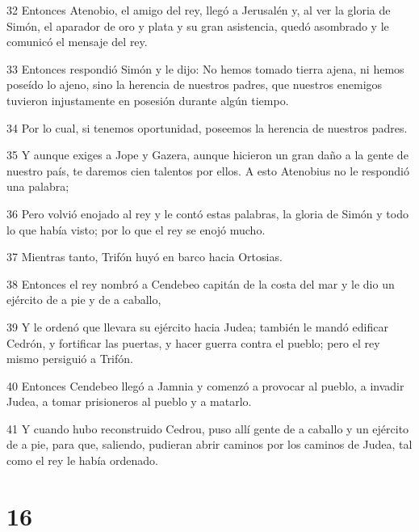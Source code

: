 \par 32 Entonces Atenobio, el amigo del rey, llegó a Jerusalén y, al ver la gloria de Simón, el aparador de oro y plata y su gran asistencia, quedó asombrado y le comunicó el mensaje del rey.
\par 33 Entonces respondió Simón y le dijo: No hemos tomado tierra ajena, ni hemos poseído lo ajeno, sino la herencia de nuestros padres, que nuestros enemigos tuvieron injustamente en posesión durante algún tiempo.
\par 34 Por lo cual, si tenemos oportunidad, poseemos la herencia de nuestros padres.
\par 35 Y aunque exiges a Jope y Gazera, aunque hicieron un gran daño a la gente de nuestro país, te daremos cien talentos por ellos. A esto Atenobius no le respondió una palabra;
\par 36 Pero volvió enojado al rey y le contó estas palabras, la gloria de Simón y todo lo que había visto; por lo que el rey se enojó mucho.
\par 37 Mientras tanto, Trifón huyó en barco hacia Ortosias.
\par 38 Entonces el rey nombró a Cendebeo capitán de la costa del mar y le dio un ejército de a pie y de a caballo,
\par 39 Y le ordenó que llevara su ejército hacia Judea; también le mandó edificar Cedrón, y fortificar las puertas, y hacer guerra contra el pueblo; pero el rey mismo persiguió a Trifón.
\par 40 Entonces Cendebeo llegó a Jamnia y comenzó a provocar al pueblo, a invadir Judea, a tomar prisioneros al pueblo y a matarlo.
\par 41 Y cuando hubo reconstruido Cedrou, puso allí gente de a caballo y un ejército de a pie, para que, saliendo, pudieran abrir caminos por los caminos de Judea, tal como el rey le había ordenado.

\chapter{16}

